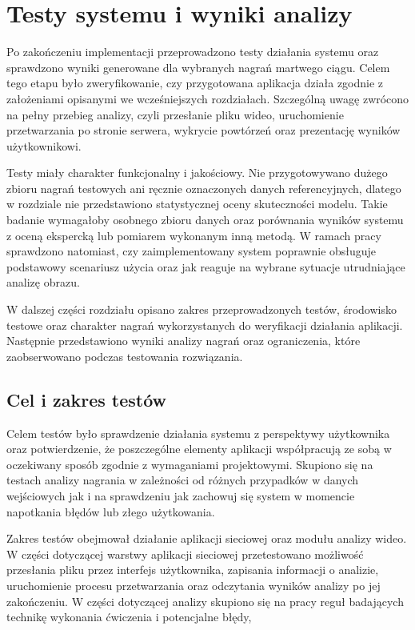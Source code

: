 \section{Testy systemu i wyniki analizy}

Po zakończeniu implementacji przeprowadzono testy działania systemu oraz sprawdzono wyniki generowane dla wybranych nagrań martwego ciągu. Celem tego etapu było zweryfikowanie, czy przygotowana aplikacja działa zgodnie z założeniami opisanymi we wcześniejszych rozdziałach. Szczególną uwagę zwrócono na pełny przebieg analizy, czyli przesłanie pliku wideo, uruchomienie przetwarzania po stronie serwera, wykrycie powtórzeń oraz prezentację wyników użytkownikowi.

Testy miały charakter funkcjonalny i jakościowy. Nie przygotowywano dużego zbioru nagrań testowych ani ręcznie oznaczonych danych referencyjnych, dlatego w rozdziale nie przedstawiono statystycznej oceny skuteczności modelu. Takie badanie wymagałoby osobnego zbioru danych oraz porównania wyników systemu z oceną ekspercką lub pomiarem wykonanym inną metodą. W ramach pracy sprawdzono natomiast, czy zaimplementowany system poprawnie obsługuje podstawowy scenariusz użycia oraz jak reaguje na wybrane sytuacje utrudniające analizę obrazu.

W dalszej części rozdziału opisano zakres przeprowadzonych testów, środowisko testowe oraz charakter nagrań wykorzystanych do weryfikacji działania aplikacji. Następnie przedstawiono wyniki analizy nagrań oraz ograniczenia, które zaobserwowano podczas testowania rozwiązania.

\subsection{Cel i zakres testów}

Celem testów było sprawdzenie działania systemu z perspektywy użytkownika oraz potwierdzenie, że poszczególne elementy aplikacji współpracują ze sobą w oczekiwany sposób zgodnie z wymaganiami projektowymi. Skupiono się na testach analizy nagrania w zależności od różnych przypadków w danych wejściowych jak i na sprawdzeniu jak zachowuj się system w momencie napotkania błędów lub złego użytkowania.

Zakres testów obejmował działanie aplikacji sieciowej oraz modułu analizy wideo. W części dotyczącej warstwy aplikacji sieciowej przetestowano możliwość przesłania pliku przez interfejs użytkownika, zapisania informacji o analizie, uruchomienie procesu przetwarzania oraz odczytania wyników analizy po jej zakończeniu. W części dotyczącej analizy skupiono się na pracy reguł badających technikę wykonania ćwiczenia i potencjalne błędy,

